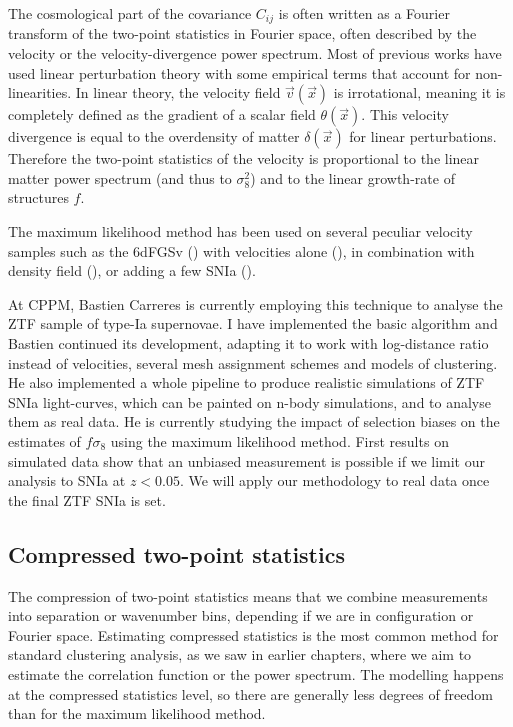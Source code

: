     The cosmological part of the covariance $C_{ij}$ is often written as a 
    Fourier transform of the two-point statistics in Fourier space, 
    often described by the velocity or the velocity-divergence power 
    spectrum. 
    Most of previous works have used linear perturbation theory with  
    some empirical terms that account for non-linearities.  
    In linear theory, the velocity field $\vec{v}(\vec{x})$ is irrotational, meaning it 
    is completely defined as the gradient of a scalar field $\theta(\vec{x})$. 
    This velocity divergence is equal to the overdensity of matter $\delta(\vec{x})$ for linear perturbations. 
    Therefore the two-point statistics of the velocity is proportional to the linear matter power spectrum 
    (and thus to $\sigma^2_8$) and to the linear growth-rate of structures $f$. 

    The maximum likelihood method has been used on several peculiar velocity samples
    such as the 6dFGSv (\cite{campbell6dFGalaxySurvey2014, springob6dFGalaxySurvey2014})
    with velocities alone (\cite{johnson6dFGalaxySurvey2014}), in combination with density field 
    (\cite{adamsImprovingConstraintsGrowth2017, adamsJointGrowthrateMeasurements2020}), 
    or adding a few SNIa (\cite{hutererTestingLCDMLowest2017}). 
    
    At CPPM, Bastien Carreres is currently employing this technique to analyse 
    the ZTF sample of type-Ia supernovae. I have implemented the basic algorithm 
    and Bastien continued its development, adapting it to work with log-distance 
    ratio instead of velocities, several mesh assignment schemes and models of clustering. 
    He also implemented a whole pipeline to produce realistic simulations of ZTF SNIa light-curves, 
    which can be painted on n-body simulations, and to analyse them as real data. 
    He is currently studying 
    the impact of selection biases on the estimates of $f\sigma_8$ using the 
    maximum likelihood method. First results on simulated data show that an unbiased measurement 
    is possible if we limit our analysis to SNIa at $z< 0.05$. 
    We will apply our methodology to real data once the final ZTF SNIa is set. 


    \subsection{Compressed two-point statistics}
    \label{velocities:methods:compressed_two_point} 

    The compression of two-point statistics means that we combine measurements 
    into separation or wavenumber bins, depending if we are in configuration or Fourier space. 
    Estimating compressed statistics is the most common method for  
    standard clustering analysis, as we saw in earlier chapters, 
    where we aim to estimate the correlation function or the power spectrum.
    The modelling happens at the compressed statistics level, so there are generally less 
    degrees of freedom than for the maximum likelihood method. 

